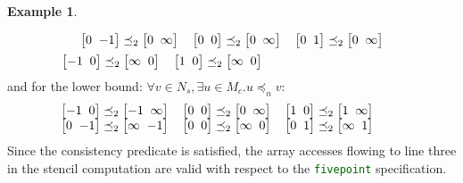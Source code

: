 \documentclass[10pt,preprint]{sigplanconf}
\newcounter{block}
\theoremstyle{definition}
\newtheorem{example}[block]{Example}
\newcommand{\vtwoh}[2]{\setlength{\arraycolsep}{0em}
\left[\begin{array}{cc}#1 \; & \; #2\end{array}\right]}
\begin{document}
\begin{example}
\begin{enumerate}
\begin{align}
\begin{array}{l}
     \vtwoh{0}{-1} \preceq_2 \vtwoh{0}{\infty} \quad
     \vtwoh{0}{0} \preceq_2 \vtwoh{0}{\infty} \quad
     \vtwoh{0}{1} \preceq_2 \vtwoh{0}{\infty} \\[0.5em]
        \hspace{-1.5em}\vtwoh{-1}{0} \preceq_2 \vtwoh{\infty}{0} \quad
     \vtwoh{1}{0} \preceq_2 \vtwoh{\infty}{0}
     \end{array}
  \label{eq:check-example-upper}
  \end{align}
  and for the lower bound: $\forall v \in N_s, \exists u \in M_c . u
  \preceq_n v$:
  \begin{align}
    \hspace{-1em}
    \begin{array}{l}
     \hspace{-1.3em}\vtwoh{-1}{0} \preceq_2 \vtwoh{-1}{\infty} \quad
     \vtwoh{0}{0} \preceq_2 \vtwoh{0}{\infty} \quad
     \vtwoh{1}{0} \preceq_2 \vtwoh{1}{\infty}  \\
     \hspace{-1.3em}\vtwoh{0}{-1}  \preceq_2 \vtwoh{\infty}{-1} \quad
     \vtwoh{0}{0}  \preceq_2 \vtwoh{\infty}{0} \quad
     \vtwoh{0}{1}  \preceq_2 \vtwoh{\infty}{1}
     \end{array}
    \label{eq:check-example-lower}
  \end{align}
  Since the consistency predicate is satisfied, the array
  accesses flowing to line three in the stencil computation are valid
  with respect to the {\textcolor{darkgreen}{\texttt{fivepoint}}} specification.
\end{enumerate}
\vspace{-0.7em}
\end{example}
\end{document}

